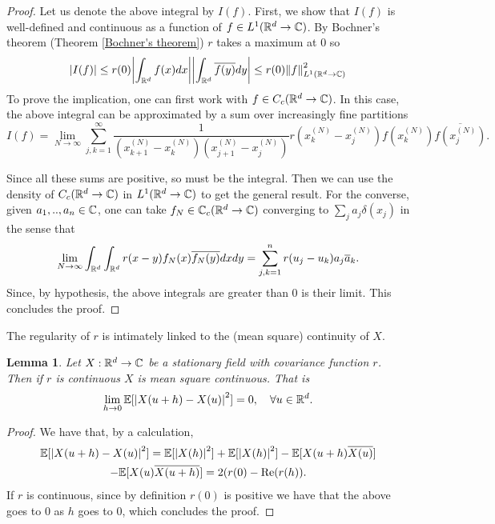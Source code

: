 \documentclass[12pt]{article}
\newtheorem{lemma}{Lemma}
\begin{document}
\begin{proof}
    Let us denote the above integral by $I(f)$. First, we show that $I(f)$ is well-defined and continuous as a function of $f \in L^1({\mathbb R}^d\to\mathbb{C})$. By Bochner's theorem (Theorem \ref{Bochner's theorem}) $r$ takes a maximum at  $0$ so
    \begin{equation*}
        \abs{I(f)}\leq r(0)\abs{\int_{{\mathbb R}^d}f(x)dx}\abs{\int_{{\mathbb R}^d}\overline{f(y)}dy}\leq r(0)\norm{f}_{L^1({\mathbb R}^d\to \mathbb{C})}^2
    \end{equation*}
    To prove the implication, one can first work with  $f\in C_c({\mathbb R}^d\to\mathbb{C})$. In this case, the above integral can be approximated by a sum over increasingly fine partitions
    \begin{equation*}
        I(f)=\lim_{N\to\infty}\sum_{j,k=1}^\infty\frac{1}{(x_{k+1}^{(N)}-x_k^{(N)})(x_{j+1}^{(N)}-x_j^{(N)})} r(x^{(N)}_k-x^{(N)}_j)f(x^{(N)}_k)\overline{f(x^{(N)}_j)}.
    \end{equation*}

    Since all these sums are positive, so must be the integral. Then we can use the density of $C_c({\mathbb R}^d\to\mathbb{C})$ in $L^1({\mathbb R}^d\to\mathbb{C})$ to get the general result. For the converse, given $a_1,..,a_n\in \mathbb{C}$, one can take $f_N\in\mathbb{C}_c({\mathbb R}^d\to \mathbb{C})$ converging to  $\sum_{j}a_j \delta(x_j)$ in the sense that
    \begin{equation*}
        \lim_{N\to\infty}\int_{{\mathbb R}^d}\int_{{\mathbb R}^d} r(x-y)f_N(x)\overline{f_N(y)}dx dy=
        \sum_{j,k=1}^{n} r(u_j-u_k)a_j\overline{a}_k.
    \end{equation*}
    Since, by hypothesis, the above integrals are greater than $0$ is their limit. This concludes the proof.
\end{proof}
The regularity of $r$ is intimately linked to the (mean square) continuity of $X$.
\begin{lemma}
    Let  $X:{\mathbb R}^d\to\mathbb{C} $ be a stationary field with covariance function $r$. Then if $r$ is continuous $X$ is mean square continuous. That is
    \begin{equation*}
        \lim_{h\to 0}\mathbb{E}[\abs{{X(u+h)-X(u)}}^2]=0,\quad\forall u\in{\mathbb R}^d.
    \end{equation*}
\end{lemma}
\begin{proof}
    We have that, by a calculation,
    \begin{multline*}
        \mathbb{E}[\abs{{X(u+h)-X(u)}}^2]=\mathbb{E}[\abs{X(h)}^2]+\mathbb{E}[\abs{X(h)}^2]-\mathbb{E}[X(u+h)\overline{X(u)}]\\-\mathbb{E}[X(u)\overline{X(u+h)}]=2(r(0)-\Re(r(h)).
    \end{multline*}
    If $r$ is continuous, since by definition $r(0)$ is positive we have that the above goes to $0$ as $h$ goes to $0$, which concludes the proof.
\end{proof}
\end{document}
